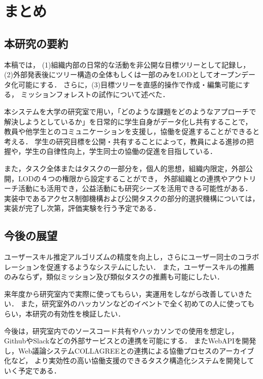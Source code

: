 \chapter{まとめ}

\section{本研究の要約}
本稿では，
(1)組織内部の日常的な活動を非公開な目標ツリーとして記録し，
(2)外部発表後にツリー構造の全体もしくは一部のみをLODとしてオープンデータ化可能にする．
さらに，(3)目標ツリーを直感的操作で作成・編集可能にする，
ミッションフォレストの試作について述べた．

本システムを大学の研究室で用い，「どのような課題をどのようなアプローチで解決しようとしているか」を日常的に学生自身がデータ化し共有することで，
教員や他学生とのコミュニケーションを支援し，協働を促進することができると考える．
学生の研究目標を公開・共有することによって，教員による進捗の把握や，学生の自律性向上，学生同士の協働の促進を目指している．

また，タスク全体またはタスクの一部分を，個人的思想，組織内限定，外部公開，LODの４つの権限から設定することができ，
外部組織との連携やアウトリーチ活動にも活用でき，公益活動にも研究シーズを活用できる可能性がある．
実装中であるアクセス制御機構および公開タスクの部分的選択機構については，実装が完了し次第，評価実験を行う予定である．

\section{今後の展望}
ユーザースキル推定アルゴリズムの精度を向上し，さらにユーザー同士のコラボレーションを促進するようなシステムにしたい．
また，ユーザースキルの推薦のみならず，類似ミッション及び類似タスクの推薦も可能にしたい．

来年度から研究室内で実際に使ってもらい，実運用をしながら改善していきたい．
また，研究室外のハッカソンなどのイベントで全く初めての人に使ってもらい，本研究の有効性を検証したい．

今後は，研究室内でのソースコード共有やハッカソンでの使用を想定し，GithubやSlackなどの外部サービスとの連携を可能にする．
またWebAPIを開発し，Web議論システムCOLLAGREEとの連携による協働プロセスのアーカイブ化など，
より実効性の高い協働支援のできるタスク構造化システムを開発していく予定である．
